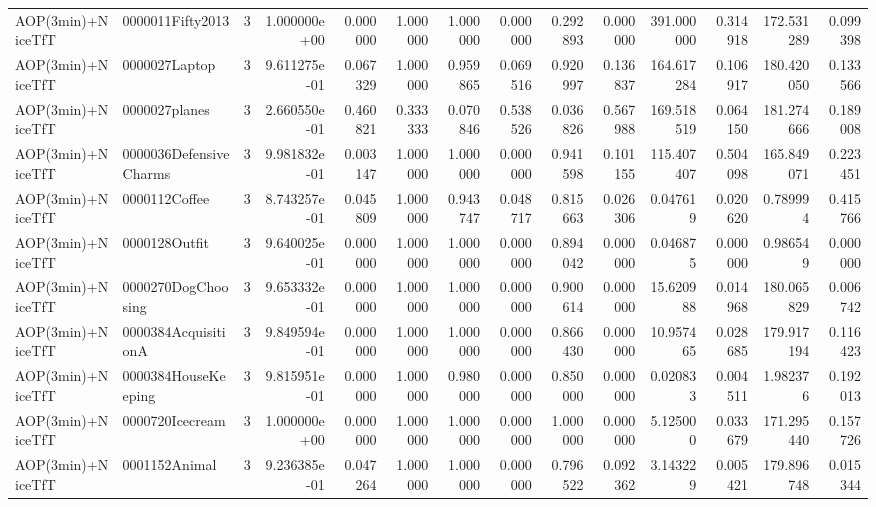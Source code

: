 \begin{tabular}{llrr|r|rr|rr|rr|rrr}
        AOP(3min)+NiceTfT &       0000011Fifty2013 &       3 & 1.000000e+00 & 0.000000 & 1.000000 &      1.000000 & 0.000000 &      0.292893 & 0.000000 &    391.000000 &    0.314918 &   172.531289 &    0.099398 \\
        AOP(3min)+NiceTfT &          0000027Laptop &       3 & 9.611275e-01 & 0.067329 & 1.000000 &      0.959865 & 0.069516 &      0.920997 & 0.136837 &    164.617284 &    0.106917 &   180.420050 &    0.133566 \\
        AOP(3min)+NiceTfT &          0000027planes &       3 & 2.660550e-01 & 0.460821 & 0.333333 &      0.070846 & 0.538526 &      0.036826 & 0.567988 &    169.518519 &    0.064150 &   181.274666 &    0.189008 \\
        AOP(3min)+NiceTfT & 0000036DefensiveCharms &       3 & 9.981832e-01 & 0.003147 & 1.000000 &      1.000000 & 0.000000 &      0.941598 & 0.101155 &    115.407407 &    0.504098 &   165.849071 &    0.223451 \\
        AOP(3min)+NiceTfT &          0000112Coffee &       3 & 8.743257e-01 & 0.045809 & 1.000000 &      0.943747 & 0.048717 &      0.815663 & 0.026306 &      0.047619 &    0.020620 &     0.789994 &    0.415766 \\
        AOP(3min)+NiceTfT &          0000128Outfit &       3 & 9.640025e-01 & 0.000000 & 1.000000 &      1.000000 & 0.000000 &      0.894042 & 0.000000 &      0.046875 &    0.000000 &     0.986549 &    0.000000 \\
        AOP(3min)+NiceTfT &     0000270DogChoosing &       3 & 9.653332e-01 & 0.000000 & 1.000000 &      1.000000 & 0.000000 &      0.900614 & 0.000000 &     15.620988 &    0.014968 &   180.065829 &    0.006742 \\
        AOP(3min)+NiceTfT &    0000384AcquisitionA &       3 & 9.849594e-01 & 0.000000 & 1.000000 &      1.000000 & 0.000000 &      0.866430 & 0.000000 &     10.957465 &    0.028685 &   179.917194 &    0.116423 \\
        AOP(3min)+NiceTfT &    0000384HouseKeeping &       3 & 9.815951e-01 & 0.000000 & 1.000000 &      0.980000 & 0.000000 &      0.850000 & 0.000000 &      0.020833 &    0.004511 &     1.982376 &    0.192013 \\
        AOP(3min)+NiceTfT &        0000720Icecream &       3 & 1.000000e+00 & 0.000000 & 1.000000 &      1.000000 & 0.000000 &      1.000000 & 0.000000 &      5.125000 &    0.033679 &   171.295440 &    0.157726 \\
        AOP(3min)+NiceTfT &          0001152Animal &       3 & 9.236385e-01 & 0.047264 & 1.000000 &      1.000000 & 0.000000 &      0.796522 & 0.092362 &      3.143229 &    0.005421 &   179.896748 &    0.015344 \\

\end{tabular}

